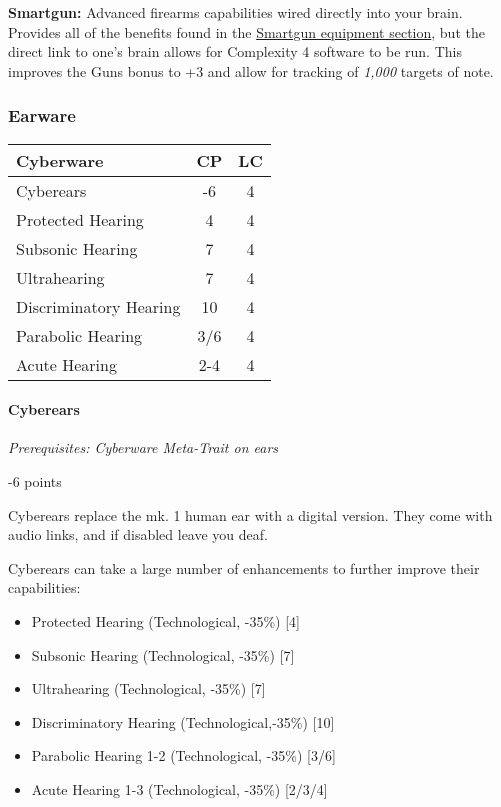 \begin{multicols*}{3}
	\textbf{Smartgun:} Advanced firearms capabilities wired directly into your brain. Provides all of the benefits found in the \hyperref[smartgun]{Smartgun equipment section}, but the direct link to one's brain allows for Complexity 4 software to be run. This improves the Guns bonus to +3 and allow for tracking of \textit{1,000} targets of note.
	
	\subsubsection{Earware}
	
	\begin{center}
		\begin{tabularx}{0.32\textwidth}{|X|c|c|}
			\hline
			Cyberware & CP & LC\\
			\hline
			\hline
			Cyberears & -6 & 4 \\
			\hline
			Protected Hearing & 4 & 4 \\
			Subsonic Hearing & 7 & 4 \\
			Ultrahearing & 7 & 4 \\
			Discriminatory Hearing & 10 & 4 \\
			Parabolic Hearing & 3/6 & 4 \\
			Acute Hearing & 2-4 & 4 \\
			\hline
		\end{tabularx}
	\end{center}
	
	\paragraph{Cyberears}
	\textit{Prerequisites: Cyberware Meta-Trait on ears}
	\begin{flushright}
		-6 points
	\end{flushright}
	
	Cyberears replace the mk. 1 human ear with a digital version. They come with audio links, and if disabled leave you deaf.
	
	Cyberears can take a large number of enhancements to further improve their capabilities: 
	
	\begin{itemize}
		\item Protected Hearing (Technological, -35\%) [4]
		\item Subsonic Hearing (Technological, -35\%) [7]
		\item Ultrahearing (Technological, -35\%) [7]
		\item Discriminatory Hearing (Technological,-35\%) [10]
		\item Parabolic Hearing 1-2 (Technological, -35\%) [3/6]
		\item Acute Hearing 1-3 (Technological, -35\%) [2/3/4]
	\end{itemize}


\end{multicols*}
